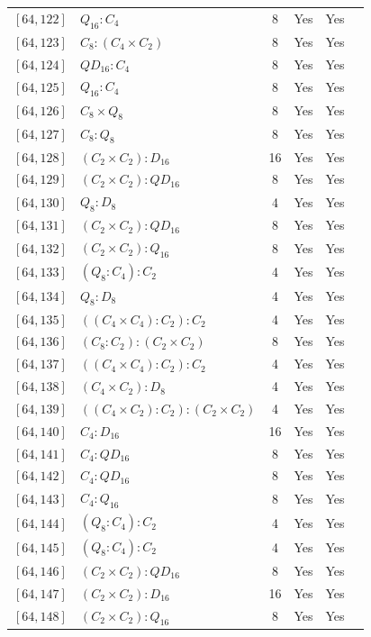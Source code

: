\documentclass[12pt, a4paper]{article}
\theoremstyle{plain}
\theoremstyle{definition}
\begin{document}
\begin{longtable}{llcccl}
  $[64,122]$ & $Q_{16} : C_4$ & 8 & Yes & Yes \\
  $[64,123]$ & $C_8 : (C_4 \times C_2)$ & 8 & Yes & Yes \\
  $[64,124]$ & $QD_{16} : C_4$ & 8 & Yes & Yes \\
  $[64,125]$ & $Q_{16} : C_4$ & 8 & Yes & Yes \\
  $[64,126]$ & $C_8 \times Q_8$ & 8 & Yes & Yes \\
  $[64,127]$ & $C_8 : Q_8$ & 8 & Yes & Yes \\
  $[64,128]$ & $(C_2 \times C_2) : D_{16}$ & 16 & Yes & Yes \\
  $[64,129]$ & $(C_2 \times C_2) : QD_{16}$ & 8 & Yes & Yes \\
  $[64,130]$ & $Q_8 : D_8$ & 4 & Yes & Yes \\
  $[64,131]$ & $(C_2 \times C_2) : QD_{16}$ & 8 & Yes & Yes \\
  $[64,132]$ & $(C_2 \times C_2) : Q_{16}$ & 8 & Yes & Yes \\
  $[64,133]$ & $(Q_8 : C_4) : C_2$ & 4 & Yes & Yes \\
  $[64,134]$ & $Q_8 : D_8$ & 4 & Yes & Yes \\
  $[64,135]$ & $((C_4 \times C_4) : C_2) : C_2$ & 4 & Yes & Yes \\
  $[64,136]$ & $(C_8 : C_2) : (C_2 \times C_2)$ & 8 & Yes & Yes \\
  $[64,137]$ & $((C_4 \times C_4) : C_2) : C_2$ & 4 & Yes & Yes \\
  $[64,138]$ & $(C_4 \times C_2) : D_8$ & 4 & Yes & Yes \\
  $[64,139]$ & $((C_4 \times C_2) : C_2) : (C_2 \times C_2)$ & 4 & Yes & Yes \\
  $[64,140]$ & $C_4 : D_{16}$ & 16 & Yes & Yes \\
  $[64,141]$ & $C_4 : QD_{16}$ & 8 & Yes & Yes \\
  $[64,142]$ & $C_4 : QD_{16}$ & 8 & Yes & Yes \\
  $[64,143]$ & $C_4 : Q_{16}$ & 8 & Yes & Yes \\
  $[64,144]$ & $(Q_8 : C_4) : C_2$ & 4 & Yes & Yes \\
  $[64,145]$ & $(Q_8 : C_4) : C_2$ & 4 & Yes & Yes \\
  $[64,146]$ & $(C_2 \times C_2) : QD_{16}$ & 8 & Yes & Yes \\
  $[64,147]$ & $(C_2 \times C_2) : D_{16}$ & 16 & Yes & Yes \\
  $[64,148]$ & $(C_2 \times C_2) : Q_{16}$ & 8 & Yes & Yes \\

\end{longtable}
\end{document}
